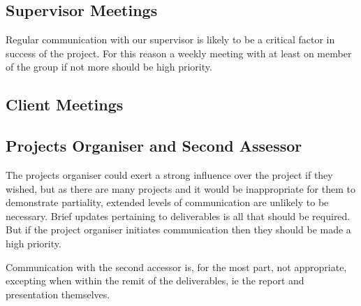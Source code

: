 \subsection{Supervisor Meetings}

Regular communication with our supervisor is likely to be a critical factor in success of the project. For this reason a weekly meeting with at least on member of the group if not more should be high priority.

\subsection{Client Meetings}

\subsection{Projects Organiser and Second Assessor}

The projects organiser could exert a strong influence over the project if they wished, but as there are many projects and it would be inappropriate for them to demonstrate partiality, extended levels of communication are unlikely to be necessary. Brief updates pertaining to deliverables is all that should be required. But if the project organiser initiates communication then they should be made a high priority.

Communication with the second accessor is, for the most part, not appropriate, excepting when within the remit of the deliverables, ie the report and presentation themselves.

